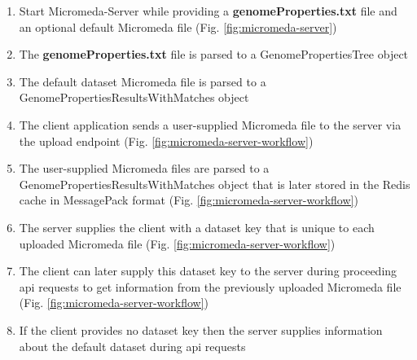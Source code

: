 \FloatBarrier
\begin{enumerate}
  \item Start Micromeda-Server while providing a \textbf{genomeProperties.txt} 
file and an optional default Micromeda file (Fig. \ref{fig:micromeda-server})
  \item The \textbf{genomeProperties.txt} file is parsed to a 
GenomePropertiesTree object
  \item The default dataset Micromeda file is parsed to a 
GenomePropertiesResultsWithMatches object  
  \item The client application sends a user-supplied Micromeda file to the 
server via the upload endpoint (Fig. \ref{fig:micromeda-server-workflow})
  \item The user-supplied Micromeda files are parsed to a 
GenomePropertiesResultsWithMatches object that is later stored in the Redis 
cache in MessagePack format (Fig. \ref{fig:micromeda-server-workflow})
  \item The server supplies the client with a dataset key that is unique to each 
uploaded Micromeda file (Fig. \ref{fig:micromeda-server-workflow})
  \item The client can later supply this dataset key to the server during 
proceeding \gls{api} requests to get information from the previously uploaded 
Micromeda file (Fig. \ref{fig:micromeda-server-workflow})
  \item If the client provides no dataset key then the server supplies 
information about the default dataset during \gls{api} requests
\end{enumerate}

